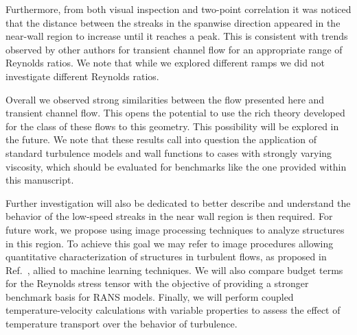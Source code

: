 \documentclass[twocolumn,10pt]{asme2e}
\begin{document}
Furthermore, from both visual inspection and two-point correlation it was noticed that the distance between the streaks in the spanwise direction appeared in the near-wall region to increase until it reaches a peak. This is consistent with trends observed by other authors for transient channel flow for an appropriate range of Reynolds ratios. We note that while we explored different ramps we did not investigate different Reynolds ratios.

Overall we observed strong similarities between the flow presented here and transient channel flow. This opens the potential to use the rich theory developed for the class of these flows to this geometry. This possibility will be explored in the future. We note that these results call into question the application of standard turbulence models and wall functions to cases with strongly varying viscosity, which should be evaluated for benchmarks like the one provided within this manuscript.

Further investigation will also be dedicated to better describe and understand the behavior of the low-speed streaks in the near wall region is then required. For future work, we propose using image processing techniques to analyze structures in this region. To achieve this goal we may refer to image procedures allowing quantitative characterization of structures in turbulent flows, as proposed in Ref.~\cite{lin2008}, allied to machine learning techniques. We will also compare budget terms for the Reynolds stress tensor with the objective of providing a stronger benchmark basis for RANS models. Finally, we will  perform coupled temperature-velocity calculations with variable properties to assess the effect of temperature transport over the behavior of turbulence.




\appendix
\end{document}
